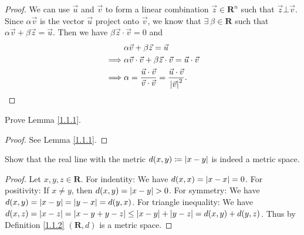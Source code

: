 \begin{proof}
    We can use \(\vec{u}\) and \(\vec{v}\) to form a linear combination \(\vec{z} \in \mathbf{R}^n\) such that \(\vec{z} \bot \vec{v}\).
    Since \(\alpha \vec{v}\) is the vector \(\vec{u}\) project onto \(\vec{v}\), we know that \(\exists\ \beta \in \mathbf{R}\) such that \(\alpha \vec{v} + \beta \vec{z} = \vec{u}\).
    Then we have \(\beta \vec{z} \cdot \vec{v} = 0\) and
    \begin{align*}
                 & \alpha \vec{v} + \beta \vec{z} = \vec{u}                                                                       \\
        \implies & \alpha \vec{v} \cdot \vec{v} + \beta \vec{z} \cdot \vec{v} = \vec{u} \cdot \vec{v}                             \\
        \implies & \alpha = \frac{\vec{u} \cdot \vec{v}}{\vec{v} \cdot \vec{v}} = \frac{\vec{u} \cdot \vec{v}}{\abs*{\vec{v}}^2}.
    \end{align*}
\end{proof}

\exercisesection

\begin{exercise}\label{ex 1.1.1}
    Prove Lemma \ref{1.1.1}.
\end{exercise}

\begin{proof}
    See Lemma \ref{1.1.1}.
\end{proof}

\begin{exercise}\label{ex 1.1.2}
    Show that the real line with the metric \(d(x, y) \coloneqq \abs*{x - y}\) is indeed a metric space.
\end{exercise}

\begin{proof}
    Let \(x, y, z \in \mathbf{R}\).
    For indentity:
    We have \(d(x, x) = \abs*{x - x} = 0\).
    For positivity:
    If \(x \neq y\), then \(d(x, y) = \abs*{x - y} > 0\).
    For symmetry:
    We have \(d(x, y) = \abs*{x - y} = \abs*{y - x} = d(y, x)\).
    For triangle inequality:
    We have \(d(x, z) = \abs*{x - z} = \abs*{x - y + y - z} \leq \abs*{x - y} + \abs*{y - z} = d(x, y) + d(y, z)\).
    Thus by Definition \ref{1.1.2} \((\mathbf{R}, d)\) is a metric space.
\end{proof}

